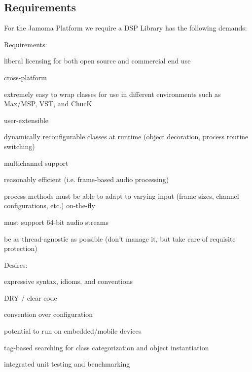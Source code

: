 \documentclass[twoside,10pt]{article}
\newenvironment{packed_item}{
\begin{itemize}
  \setlength{\itemsep}{1pt}
  \setlength{\parskip}{0pt}
  \setlength{\parsep}{0pt}
}{\end{itemize}}
\begin{document}
\subsection{Requirements}

For the Jamoma Platform we require a DSP Library has the following demands:

Requirements:
\begin{packed_item}%
	\item liberal licensing for both open source and commercial end use
	\item cross-platform
	\item extremely easy to wrap classes for use in different environments such as Max/MSP, VST, and ChucK
	\item user-extensible
	\item dynamically reconfigurable classes at runtime (object decoration, process routine switching)
	\item multichannel support
	\item reasonably efficient (i.e. frame-based audio processing)
	\item process methods must be able to adapt to varying input (frame sizes, channel configurations, etc.) on-the-fly
	\item must support 64-bit audio streams
	\item be as thread-agnostic as possible (don't manage it, but take care of requisite protection)
\end{packed_item}%

Desires:
\begin{packed_item}%
	\item expressive syntax, idioms, and conventions
	\item DRY / clear code
	\item convention over configuration
	\item potential to run on embedded/mobile devices
	\item tag-based searching for class categorization and object instantiation
	\item integrated unit testing and benchmarking
\end{packed_item}%



\end{document}
